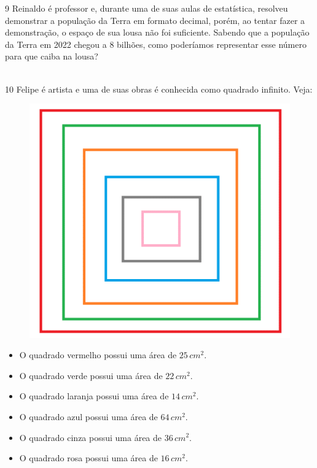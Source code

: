 \num{9} Reinaldo é professor e, durante uma de suas aulas de estatística,
resolveu demonstrar a população da Terra em formato decimal, porém, ao
tentar fazer a demonstração, o espaço de sua lousa não foi suficiente.
Sabendo que a população da Terra em 2022 chegou a 8 bilhões, como
poderíamos representar esse número para que caiba na lousa?

\\

\num{10} Felipe é artista e uma de suas obras é conhecida como quadrado
infinito. Veja:

\begin{figure}[H]
\centering\includegraphics[width=.7\textwidth]{./imgSAEB_8_MAT/media/image2.png}
\end{figure}


\begin{itemize}
\item O quadrado vermelho possui uma área de $25\,cm^2$.

\item O quadrado verde possui uma área de $22\,cm^2$.

\item O quadrado laranja possui uma área de $14\,cm^2$.

\item O quadrado azul possui uma área de $64\,cm^2$.

\item O quadrado cinza possui uma área de $36\,cm^2$.

\item O quadrado rosa possui uma área de $16\,cm^2$.
\end{itemize}

